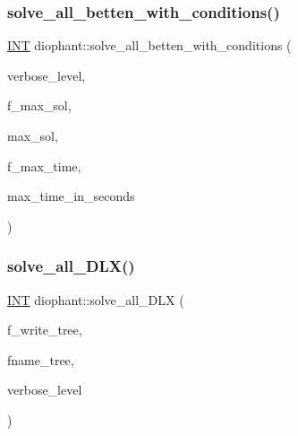 \mbox{\label{classdiophant_a93690970610c6bad8d4a0cfbe7642826}} 
\subsubsection{\texorpdfstring{solve\+\_\+all\+\_\+betten\+\_\+with\+\_\+conditions()}{solve\_all\_betten\_with\_conditions()}}
{\footnotesize\ttfamily \mbox{\hyperlink{galois_8h_a09fddde158a3a20bd2dcadb609de11dc}{I\+NT}} diophant\+::solve\+\_\+all\+\_\+betten\+\_\+with\+\_\+conditions (\begin{DoxyParamCaption}\item[{\mbox{\hyperlink{galois_8h_a09fddde158a3a20bd2dcadb609de11dc}{I\+NT}}}]{verbose\+\_\+level,  }\item[{\mbox{\hyperlink{galois_8h_a09fddde158a3a20bd2dcadb609de11dc}{I\+NT}}}]{f\+\_\+max\+\_\+sol,  }\item[{\mbox{\hyperlink{galois_8h_a09fddde158a3a20bd2dcadb609de11dc}{I\+NT}}}]{max\+\_\+sol,  }\item[{\mbox{\hyperlink{galois_8h_a09fddde158a3a20bd2dcadb609de11dc}{I\+NT}}}]{f\+\_\+max\+\_\+time,  }\item[{\mbox{\hyperlink{galois_8h_a09fddde158a3a20bd2dcadb609de11dc}{I\+NT}}}]{max\+\_\+time\+\_\+in\+\_\+seconds }\end{DoxyParamCaption})}

\mbox{\label{classdiophant_aeddc759e377a9c710e03935cc463059d}} 
\subsubsection{\texorpdfstring{solve\+\_\+all\+\_\+\+D\+L\+X()}{solve\_all\_DLX()}}
{\footnotesize\ttfamily \mbox{\hyperlink{galois_8h_a09fddde158a3a20bd2dcadb609de11dc}{I\+NT}} diophant\+::solve\+\_\+all\+\_\+\+D\+LX (\begin{DoxyParamCaption}\item[{\mbox{\hyperlink{galois_8h_a09fddde158a3a20bd2dcadb609de11dc}{I\+NT}}}]{f\+\_\+write\+\_\+tree,  }\item[{const \mbox{\hyperlink{galois_8h_ab6cc7b4aeb6ea31aba2b3fbfc83ff5e6}{B\+Y\+TE}} $\ast$}]{fname\+\_\+tree,  }\item[{\mbox{\hyperlink{galois_8h_a09fddde158a3a20bd2dcadb609de11dc}{I\+NT}}}]{verbose\+\_\+level }\end{DoxyParamCaption})}

